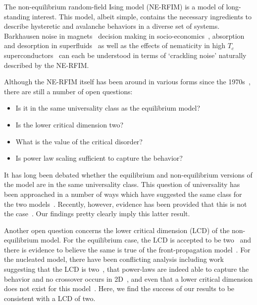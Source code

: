 \documentclass[reprint,amsmath,amssymb,aps,floatfix, prl]{revtex4-1}
\begin{document}
The non-equilibrium random-field Ising model (NE-RFIM) is a model of long-standing interest. This model, albeit simple, contains the necessary ingredients to describe hysteretic and avalanche behaviors in a diverse set of systems. Barkhausen noise in magnets~\cite{Bertotti98} decision making in socio-economics~\cite{Bouchaud13}, absorption and desorption in superfluids~\cite{Lilly96, Detcheverry04} as well as the effects of nematicity in high $T_c$ superconductors~\cite{Bonetti04, Carlson06, Phillabaum2012} can each be understood in terms of `crackling noise' naturally described by the NE-RFIM. \par
%
Although the NE-RFIM itself has been around in various forms since the 1970s~\cite{ImryMa75}, there are still a number of open questions:
%
\begin{itemize}
	\item Is it in the same universality class as the equilibrium model?
	\item Is the lower critical dimension two?
	\item What is the value of the critical disorder?
	\item Is power law scaling sufficient to capture the behavior?
\end{itemize}
%
It has long been debated whether the equilibrium and non-equilibrium versions of the model are in the same universality class. This question of universality has been approached in a number of ways which have suggested the same class for the two models~\cite{Maritan94, Perez-Reche04, Colaiori04, LiuDahmen09, LiuDahmen09-2,BalogTissierTarjus14}. Recently, however, evidence has been provided that this is not the case~\cite{BalogTarjusTissier18}. Our findings pretty clearly imply this latter result. \par
%
Another open question concerns the lower critical dimension (LCD) of the non-equilibrium model. For the equilibrium case, the LCD is accepted to be two~\cite{BrayMoore85} and there is evidence to believe the same is true of the front-propagation model~\cite{Drossel98}. For the nucleated model, there have been conflicting analysis including work suggesting that the LCD is two~\cite{Perkovic95,Perkovic96}, that power-laws are indeed able to capture the behavior and no crossover occurs in 2D~\cite{Spasojevic11, Spasojevic11-2}, and even that a lower critical dimension does not exist for this model~\cite{Thongjaomayum13,Kurbah15,Shukla16,Shukla17}. Here, we find the success of our results to be consistent with a LCD of two. \par
\end{document}
